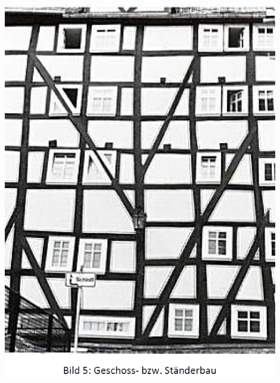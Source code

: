 \documentclass[fleqn,twoside]{article}
\begin{document}
    \begin{minipage}{0.4\textwidth}
        \includegraphics[width=0.9\textwidth]{Grafiken/Geschichte des Holzbaus/Geschoss- bzw. Staenderbau.png}
    \end{minipage}
    
    
\end{document}
